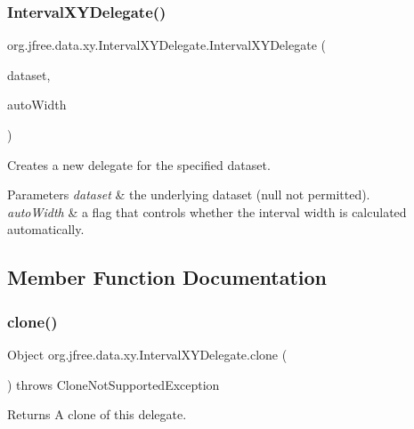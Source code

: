 \subsubsection{\texorpdfstring{Interval\+X\+Y\+Delegate()}{IntervalXYDelegate()}\hspace{0.1cm}{\footnotesize\ttfamily [2/2]}}
{\footnotesize\ttfamily org.\+jfree.\+data.\+xy.\+Interval\+X\+Y\+Delegate.\+Interval\+X\+Y\+Delegate (\begin{DoxyParamCaption}\item[{\mbox{\hyperlink{interfaceorg_1_1jfree_1_1data_1_1xy_1_1_x_y_dataset}{X\+Y\+Dataset}}}]{dataset,  }\item[{boolean}]{auto\+Width }\end{DoxyParamCaption})}

Creates a new delegate for the specified dataset.


\begin{DoxyParams}{Parameters}
{\em dataset} & the underlying dataset ({\ttfamily null} not permitted). \\
\hline
{\em auto\+Width} & a flag that controls whether the interval width is calculated automatically. \\
\hline
\end{DoxyParams}


\subsection{Member Function Documentation}
\mbox{\label{classorg_1_1jfree_1_1data_1_1xy_1_1_interval_x_y_delegate_ada5c4ccbc95a673528798ae42a4a6a4e}} 
\subsubsection{\texorpdfstring{clone()}{clone()}}
{\footnotesize\ttfamily Object org.\+jfree.\+data.\+xy.\+Interval\+X\+Y\+Delegate.\+clone (\begin{DoxyParamCaption}{ }\end{DoxyParamCaption}) throws Clone\+Not\+Supported\+Exception}

\begin{DoxyReturn}{Returns}
A clone of this delegate.
\end{DoxyReturn}

